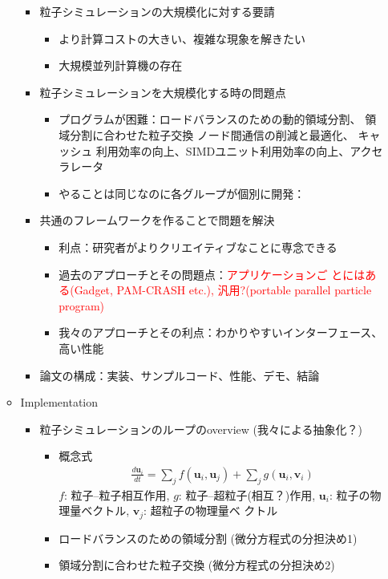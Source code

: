 \documentclass[12pt,a4paper]{jarticle}
\newcommand{\redtext}[1]{\textcolor{red}{#1}}
\begin{document}
\begin{itemize}
\begin{itemize}
\begin{itemize}
    \item 粒子シミュレーションの大規模化に対する要請
      \begin{itemize}
      \item より計算コストの大きい、複雑な現象を解きたい
      \item 大規模並列計算機の存在
      \end{itemize}
    \item 粒子シミュレーションを大規模化する時の問題点
      \begin{itemize}
      \item プログラムが困難：ロードバランスのための動的領域分割、 領
        域分割に合わせた粒子交換 ノード間通信の削減と最適化、 キャッシュ
        利用効率の向上、SIMDユニット利用効率の向上、アクセラレータ
      \item やることは同じなのに各グループが個別に開発：
      \end{itemize}
    \item 共通のフレームワークを作ることで問題を解決
      \begin{itemize}
      \item 利点：研究者がよりクリエイティブなことに専念できる
      \item 過去のアプローチとその問題点：\redtext{アプリケーションご
        とにはある(Gadget, PAM-CRASH etc.), 汎用?(portable
        parallel particle program)}
      \item 我々のアプローチとその利点：わかりやすいインターフェース、
        高い性能
      \end{itemize}
    \item 論文の構成：実装、サンプルコード、性能、デモ、結論
    \end{itemize}
  \item Implementation
    \begin{itemize}
    \item 粒子シミュレーションのループのoverview (我々による抽象化？)
      \begin{itemize}
      \item 概念式
        \begin{align}
          \frac{d\bm{u}_i}{dt} = \sum_j f(\bm{u}_i,\bm{u}_j) + \sum_j
          g(\bm{u}_i,\bm{v}_i)
        \end{align}
        $f$: 粒子--粒子相互作用, $g$: 粒子--超粒子(相互？)作用,
        $\bm{u}_i$: 粒子の物理量ベクトル, $\bm{v}_j$: 超粒子の物理量ベ
        クトル
      \item ロードバランスのための領域分割 (微分方程式の分担決め1)
      \item 領域分割に合わせた粒子交換 (微分方程式の分担決め2)

\end{itemize}
\end{itemize}
\end{itemize}
\end{itemize}
\end{document}
